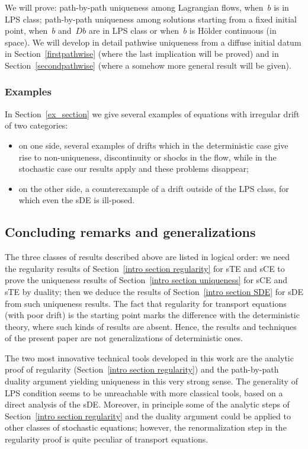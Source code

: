\documentclass[a4paper,10pt]{article}
\newcommand\1{\mathbbm{1}}
\numberwithin{equation}{section}
\begin{document}
We will prove: path-by-path uniqueness among Lagrangian flows, when~$b$ is in LPS class; path-by-path uniqueness among solutions starting from a fixed initial point, when~$b$ and~$Db$ are in LPS class or when~$b$ is H\"older continuous (in space). We will develop in detail pathwise uniqueness from a diffuse initial datum in Section~\ref{firstpathwise} (where the last implication will be proved) and in Section~\ref{secondpathwise} (where a somehow more general result will be given).

\subsubsection{Examples}

In Section~\ref{ex_section} we give several examples of equations with irregular drift of two categories:
\begin{itemize}
\item[i)] on one side, several examples of drifts which in the deterministic case give rise to non-uniqueness, discontinuity or shocks in the flow, while in the stochastic case our results apply and these problems disappear;
\item[ii)] on the other side, a counterexample of a drift outside of the LPS class, for which even the sDE is ill-posed.
\end{itemize}

\subsection{Concluding remarks and generalizations}\label{general}

The three classes of results described above are listed in logical order: we need the regularity results of Section~\ref{intro section regularity} for sTE and sCE to prove the uniqueness results of Section~\ref{intro section uniqueness} for sCE and sTE by duality; then we deduce the results of Section~\ref{intro section SDE} for sDE from such uniqueness results. The fact that regularity for transport equations (with poor drift) is the starting point marks the difference with the deterministic theory, where such kinds of results are absent. Hence, the results and techniques of the present paper are not generalizations of deterministic ones.

The two most innovative technical tools developed in this work are the analytic proof of regularity (Section~\ref{intro section regularity}) and the path-by-path duality argument yielding uniqueness in this very strong sense. The generality of LPS condition seems to be unreachable with more classical tools, based on a direct analysis of the sDE. Moreover, in principle some of the analytic steps of Section~\ref{intro section regularity} and the duality argument could be applied to other classes of stochastic equations; however, the renormalization step in the regularity proof is quite peculiar of transport equations.
\end{document}
